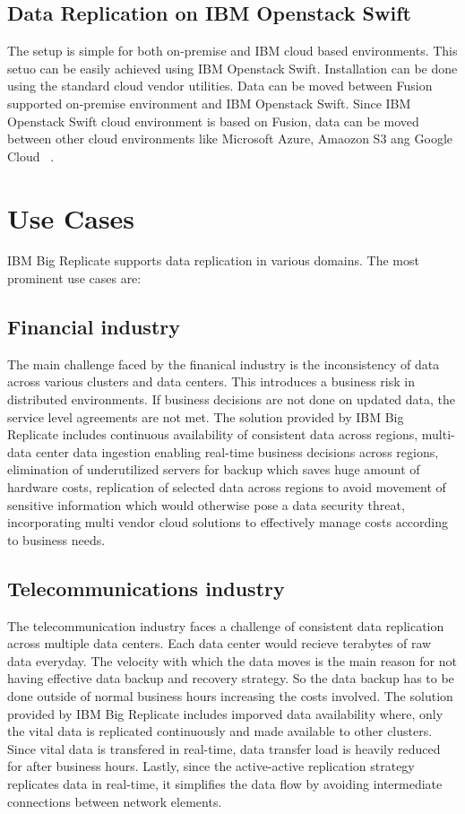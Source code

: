 \subsection{Data Replication on IBM Openstack Swift}
The setup is simple for both on-premise and IBM cloud based environments. This
setuo can be easily achieved using IBM Openstack Swift. Installation can be done
using the standard cloud vendor utilities. Data can be moved between Fusion
supported on-premise environment and IBM Openstack Swift. Since IBM Openstack
Swift cloud environment is based on Fusion, data can be moved between other
cloud environments like Microsoft Azure, Amaozon S3 ang Google Cloud
~\cite{hid-sp18-408-IBMBigReplicate-features}.

\section{Use Cases}
IBM Big Replicate supports data replication in various domains. The most 
prominent use cases are:

\subsection{Financial industry}
The main challenge faced by the finanical industry is the inconsistency of data
across various clusters and data centers. This introduces a business risk in 
distributed environments. If business decisions are not done on updated data,
the service level agreements are not met. The solution provided by IBM Big
Replicate includes continuous availability of consistent data across regions, 
multi-data center data ingestion enabling real-time business decisions across
regions, elimination of underutilized servers for backup which saves huge amount
of hardware costs, replication of selected data across regions to avoid movement
of sensitive information which would otherwise pose a data security threat, 
incorporating multi vendor cloud solutions to effectively manage costs according
to business needs.

\subsection{Telecommunications industry}
The telecommunication industry faces a challenge of consistent data replication
across multiple data centers. Each data center would recieve terabytes of raw
data everyday. The velocity with which the data moves is the main reason for not
having effective data backup and recovery strategy. So the data backup has to be
done outside of normal business hours increasing the costs involved. The
solution provided by IBM Big Replicate includes imporved data availability 
where, only the vital data is replicated continuously and made available to
other clusters. Since vital data is transfered in real-time, data transfer load
is heavily reduced for after business hours. Lastly, since the active-active
replication strategy replicates data in real-time, it simplifies the data flow
by avoiding intermediate connections between network elements.

